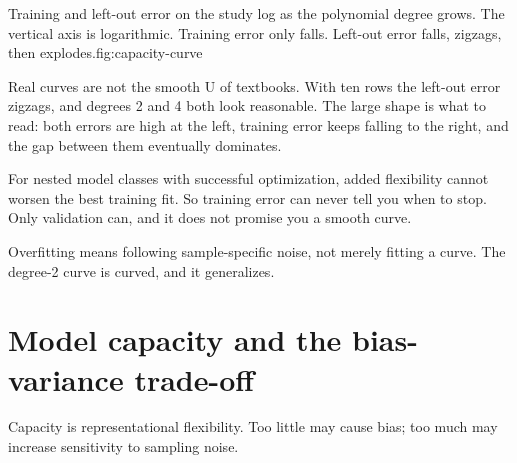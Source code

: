 \begin{utpfig}{Training and left-out error on the study log as the polynomial degree grows. The vertical axis is logarithmic. Training error only falls. Left-out error falls, zigzags, then explodes.}{fig:capacity-curve}
\end{utpfig}

Real curves are not the smooth U of textbooks. With ten rows the left-out error zigzags, and degrees 2 and 4 both look reasonable. The large shape is what to read: both errors are high at the left, training error keeps falling to the right, and the gap between them eventually dominates.

\begin{intuition}
For nested model classes with successful optimization, added flexibility cannot worsen the best training fit. So training error can never tell you when to stop. Only validation can, and it does not promise you a smooth curve.
\end{intuition}

\begin{keyidea}
Overfitting means following sample-specific noise, not merely fitting a curve. The degree-2 curve is curved, and it generalizes.
\end{keyidea}

\section{Model capacity and the bias-variance trade-off}\label{sec:bias-variance}

Capacity is representational flexibility. Too little may cause bias; too much may increase sensitivity to sampling noise.

